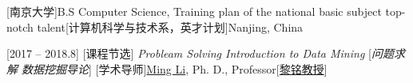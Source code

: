 \documentclass[language=chinese]{bilingualcv}
\begin{document}
\maketitle
\begin{education}
    [南京大学]{B.S Computer Science, Training plan of the national basic subject top-notch talent}[计算机科学与技术系，英才计划]{Nanjing, China}
    \begin{detail}
        [2017 -- 2018.8]
        [课程节选]{ 
              {\it Probleam Solving \hspace{1cm}Introduction to Data Mining}
        }[\textit{问题求解\hspace{1cm} 数据挖掘导论}]
        [学术导师]{\href{http://cs.nju.edu.cn/lim/}{Ming Li}, Ph. D., Professor}[\href{http://cs.nju.edu.cn/lim/}{黎铭教授}]
    \end{detail}
\end{education}
\end{document}
